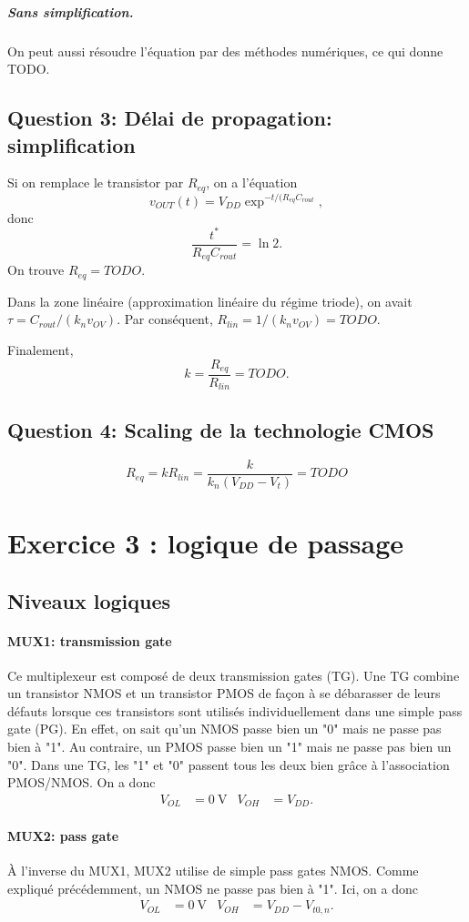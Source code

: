 \documentclass[frenchb,DIV=14]{scrartcl}
\begin{document}
\subparagraph{Sans simplification.} On peut aussi résoudre l'équation
par des méthodes numériques, ce qui donne TODO.

\subsection*{Question 3: Délai de propagation: simplification}

Si on remplace le transistor par $R_{eq}$, on a l'équation
\[v_{OUT}(t) = V_{DD} \exp^{-t/(R_{eq}C_{rout}},\]
donc \[\frac{t^*}{R_{eq}C_{rout}} = \ln 2.\]
On trouve $R_{eq} = TODO$.

Dans la zone linéaire (approximation linéaire du régime triode),
on avait $\tau = C_{rout} / (k_n v_{OV})$. Par conséquent,
$R_{lin} = 1 / (k_n v_{OV}) = TODO$.

Finalement,
\[k = \frac{R_{eq}}{R_{lin}} = TODO.\]

\subsection*{Question 4: Scaling de la technologie CMOS}

\[R_{eq} = k R_{lin} = \frac{k}{k_n (V_{DD} - V_t)} = TODO\]

\section*{Exercice 3 : logique de passage}
\subsection*{Niveaux logiques}
\paragraph{MUX1: transmission gate} 
Ce multiplexeur est composé de deux transmission gates (TG).
Une TG combine un transistor NMOS et un transistor PMOS de façon à se débarasser
de leurs défauts lorsque ces transistors sont utilisés individuellement dans une
simple pass gate (PG). En effet, on sait qu'un NMOS passe bien un "0" mais ne passe
pas bien à "1". Au contraire, un PMOS passe bien un "1" mais ne passe pas bien un "0".
Dans une TG, les "1" et "0" passent tous les deux bien grâce à l'association PMOS/NMOS.
On a donc
\begin{align*}
	V_{OL} &= \SI{0}{\volt} & V_{OH} &= V_{DD}.
\end{align*}

\paragraph{MUX2: pass gate} 
\`{A} l'inverse du MUX1, MUX2 utilise de simple pass gates NMOS.
Comme expliqué précédemment, un NMOS ne passe pas bien à "1". Ici, on a donc
\begin{align*}
	V_{OL} &= \SI{0}{\volt} & V_{OH} &= V_{DD}-V_{t0,n}.
\end{align*}
\end{document}
